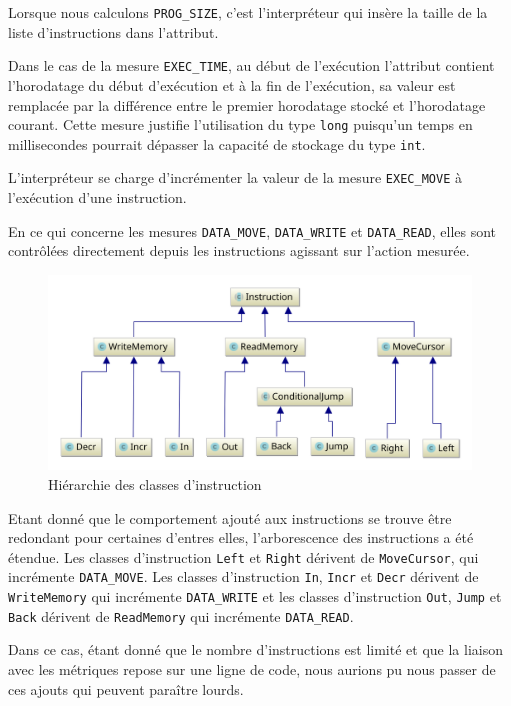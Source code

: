 \documentclass[titlepage]{article}
\begin{document}
    Lorsque nous calculons \texttt{PROG\_SIZE}, c'est l'interpréteur qui insère la taille de la liste d'instructions dans l'attribut.


    Dans le cas de la mesure \texttt{EXEC\_TIME}, au début de l'exécution l'attribut contient l'horodatage du début d'exécution et à la fin de l'exécution, sa valeur est remplacée par la différence entre le premier horodatage stocké et l'horodatage courant. Cette mesure justifie l'utilisation du type \texttt{long} puisqu'un temps en millisecondes pourrait dépasser la capacité de stockage du type \texttt{int}.


     L'interpréteur se charge d'incrémenter la valeur de la mesure  \texttt{EXEC\_MOVE} à l'exécution d'une instruction.


    En ce qui concerne les mesures \texttt{DATA\_MOVE}, \texttt{DATA\_WRITE} et \texttt{DATA\_READ}, elles sont contrôlées directement depuis les instructions agissant sur l'action mesurée.


\begin{figure}[!hb]
        \centering
        \includegraphics[scale=0.6]{svgL3/instructions}
        \caption{Hiérarchie des classes d'instruction}
\end{figure}

    Etant donné que le comportement ajouté aux instructions se trouve être redondant pour certaines d'entres elles, l'arborescence des instructions a été étendue. Les classes d'instruction \texttt{Left} et \texttt{Right} dérivent de \texttt{MoveCursor}, qui incrémente \texttt{DATA\_MOVE}. Les classes d'instruction \texttt{In}, \texttt{Incr} et \texttt{Decr} dérivent de \texttt{WriteMemory} qui incrémente \texttt{DATA\_WRITE} et les classes d'instruction \texttt{Out}, \texttt{Jump} et \texttt{Back} dérivent de \texttt{ReadMemory} qui incrémente \texttt{DATA\_READ}.

    Dans ce cas, étant donné que le nombre d'instructions est limité et que la liaison avec les métriques repose sur une ligne de code, nous aurions pu nous passer de ces ajouts qui peuvent paraître lourds.
\end{document}
